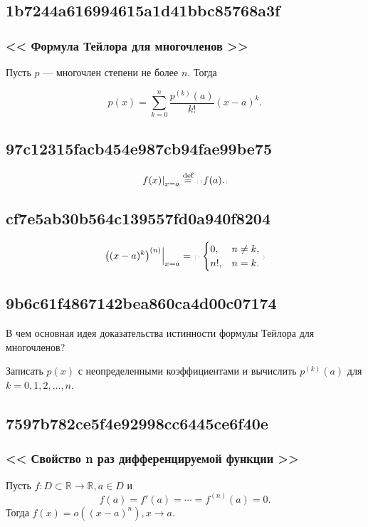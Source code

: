 \documentclass[11pt, a5paper]{article}
\newenvironment{note}[1]{\goodbreak\par\subsection{\hfill \color{lightgray}\tiny #1}}{}
\newenvironment{cloze}[2][\ldots]{\begin{leftbar}}{\end{leftbar}}
\newenvironment{icloze}[2][\ldots]{%
  \ignorespaces\text{\tiny \color{lightgray}\{#2} %
}{%
  \text{\tiny\color{lightgray}\}}\unskip%
}
\begin{document}
\begin{note}{1b7244a616994615a1d41bbc85768a3f}
    \subsubsection{<<\begin{icloze}{3}Формула Тейлора для многочленов\end{icloze}>>}

    Пусть \( p \) --- \begin{icloze}{2}многочлен степени не более \( n \).\end{icloze} Тогда \begin{icloze}{1}
        \[
            p(x) = \sum_{k=0}^{n} \frac{p^{(k)} (a)}{k! } (x - a)^{k}.
        \]
    \end{icloze}
\end{note}

\begin{note}{97c12315facb454e987cb94fae99be75}
\[
    \left. f(x) \right|_{x = a} \overset{\text{def}}= \begin{icloze}{1}f(a).\end{icloze}
\]
\end{note}

\begin{note}{cf7e5ab30b564c139557fd0a940f8204}
    \[
        \left. \left((x - a)^{k} \right)^{(n)}  \right|_{x = a} =
        \begin{icloze}{1}
            \begin{cases}
                0, & n \neq k, \\
                n!, & n = k.
            \end{cases}
        \end{icloze}
    \]
\end{note}

\begin{note}{9b6c61f4867142bea860ca4d00c07174}
    В чем основная идея доказательства истинности формулы Тейлора для многочленов?

    \begin{cloze}{1}
        Записать \( p(x) \) с неопределенными коэффициентами и вычислить \( p^{(k)} (a) \) для \( k = 0, 1, 2, \ldots, n \).
    \end{cloze}
\end{note}

\begin{note}{7597b782ce5f4e92998cc6445ce6f40e}
    \subsubsection{<<\begin{icloze}{3}Свойство n раз дифференцируемой функции\end{icloze}>>}

    Пусть \begin{icloze}{2}\( f : D \subset \mathbb R \to \mathbb R, a \in D \) и \[
        f(a) = f'(a) = \cdots = f^{(n)} (a) = 0.
    \]\end{icloze}
    Тогда \begin{icloze}{1}\( f(x) = o((x - a)^{n} ),  x \to a \).\end{icloze}
\end{note}
\end{document}
